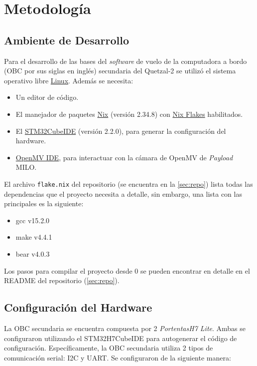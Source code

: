 \chapter{Metodología}

\section{Ambiente de Desarrollo}
Para el desarrollo de las bases del \textit{software} de vuelo de la computadora a bordo (OBC por sus siglas en inglés) secundaria del Quetzal-2 se utilizó el sistema operativo libre \href{https://www.linux.org/pages/download/}{Linux}. Además se necesita:

\begin{itemize}

	\item Un editor de código. 
	\item El manejador de paquetes \href{https://nixos.org/}{Nix} (versión 2.34.8) con \href{https://nixos.wiki/wiki/flakes}{Nix Flakes} habilitados.
	\item El \href{https://www.st.com/en/development-tools/stm32cubeide}{STM32CubeIDE} (versión 2.2.0), para generar la configuración del hardware.
	\item \href{https://openmv.io/pages/download}{OpenMV IDE}, para interactuar con la cámara de OpenMV de \textit{Payload} MILO.
\end{itemize}

El archivo \texttt{flake.nix} del repositorio (se encuentra en la \ref{sec:repo}) lista todas las dependencias que el proyecto necesita a detalle, sin embargo, una lista con las principales es la siguiente:

\begin{itemize}

\item gcc v15.2.0
\item make v4.4.1
\item bear v4.0.3
\end{itemize}

Los pasos para compilar el proyecto desde 0 se pueden encontrar en detalle en el README del repositorio (\ref{sec:repo}).

\section{Configuración del Hardware}
La OBC secundaria se encuentra compuesta por 2 \textit{PortentasH7 Lite}. Ambas se configuraron utilizando el STM32H7CubeIDE para autogenerar el código de configuración. Específicamente, la OBC secundaria utiliza 2 tipos de comunicación serial: I2C y UART. Se configuraron de la siguiente manera:

